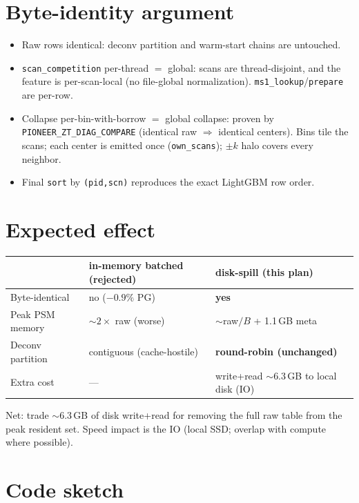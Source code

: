 \documentclass[11pt]{article}
\newcommand{\code}[1]{\texttt{\small #1}}
\begin{document}
\section{Byte-identity argument}
\begin{itemize}[nosep]
  \item Raw rows identical: deconv partition and warm-start chains are untouched.
  \item \code{scan\_competition} per-thread \(=\) global: scans are thread-disjoint, and the
    feature is per-scan-local (no file-global normalization). \code{ms1\_lookup}/\code{prepare}
    are per-row.
  \item Collapse per-bin-with-borrow \(=\) global collapse: proven by
    \code{PIONEER\_ZT\_DIAG\_COMPARE} (identical raw \(\Rightarrow\) identical centers). Bins tile
    the scans; each center is emitted once (\code{own\_scans}); \(\pm k\) halo covers every
    neighbor.
  \item Final \code{sort} by \code{(pid,scn)} reproduces the exact LightGBM row order.
\end{itemize}

\section{Expected effect}
\begin{center}\begin{tabular}{lll}
\toprule
 & in-memory batched (rejected) & disk-spill (this plan) \\
\midrule
Byte-identical & no (\(-0.9\%\) PG) & \textbf{yes} \\
Peak PSM memory & \(\sim2\times\) raw (worse) & \(\sim\)raw\(/B\) + 1.1\,GB meta \\
Deconv partition & contiguous (cache-hostile) & \textbf{round-robin (unchanged)} \\
Extra cost & --- & write+read \(\sim\)6.3\,GB to local disk (IO) \\
\bottomrule
\end{tabular}\end{center}
Net: trade \(\sim\)6.3\,GB of disk write+read for removing the full raw table from the peak
resident set. Speed impact is the IO (local SSD; overlap with compute where possible).

\section{Code sketch}
\end{document}
